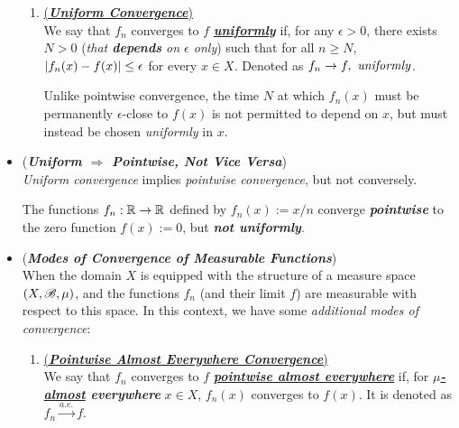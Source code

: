 \documentclass[11pt]{article}
\begin{document}
\begin{itemize}
\begin{remark}
\begin{enumerate}
\item\begin{definition}  \underline{(\emph{\textbf{Uniform Convergence}})}\\
We say that $f_n$ converges to $f$ \underline{\emph{\textbf{uniformly}}} if,  for any $\epsilon > 0$, there exists $N > 0$ (\emph{that \textbf{depends} on $\epsilon$ only})  such that for all $n \ge N$, $\left\lvert f_n(x) - f(x) \right\rvert \le  \epsilon$  for every $x \in X$. Denoted as $f_{n} \rightarrow f, \text{ \emph{uniformly}}$.
\end{definition}
Unlike pointwise convergence, the time $N$ at which $f_n(x)$ must be permanently $\epsilon$-close to $f(x)$ is not permitted to depend on $x$, but must instead be
chosen \emph{uniformly} in $x$.
\end{enumerate}
\end{remark}

\item \begin{remark} (\emph{\textbf{Uniform $\Rightarrow$ Pointwise, Not Vice Versa}})\\
\emph{Uniform convergence} implies \emph{pointwise convergence}, but not conversely. 
\begin{example}
The functions $f_n : {\mathbb R} \rightarrow {\mathbb R}$ defined by $f_n(x) := x/n$ converge \emph{\textbf{pointwise}} to the zero function $f(x) := 0$, but
\emph{\textbf{not uniformly}}.
\end{example}
\end{remark}

\item \begin{remark} (\emph{\textbf{Modes of Convergence of Measurable Functions}}) \\
When the domain $X$ is equipped with the structure of a measure space $(X, {\mathscr B}, \mu)$, and the functions $f_n$ (and their limit $f$) are measurable with respect to this space.  In this context, we have some \emph{additional modes of convergence}:
\begin{enumerate}
\item  \begin{definition}  \underline{(\emph{\textbf{Pointwise Almost Everywhere Convergence}})}\\
We say that  $f_n$ converges to $f$ \underline{\emph{\textbf{pointwise almost everywhere}}} if, for \emph{\textbf{\underline{$\mu$-almost} everywhere}} $x \in X$, $f_n(x)$ converges to $f(x)$. It is denoted as \underline{$f_{n}\stackrel{a.e.}{\rightarrow} f$}.


\end{definition}
\end{enumerate}
\end{remark}
\end{itemize}
\end{document}
